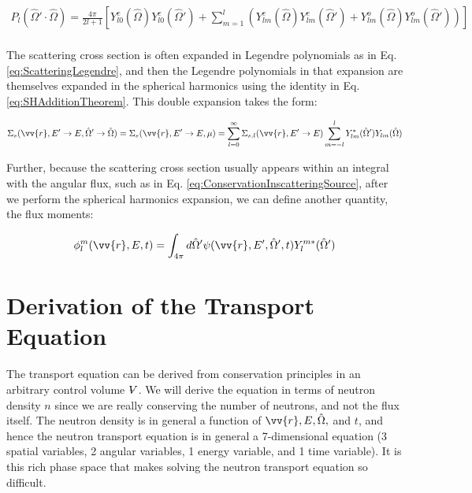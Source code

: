 \documentclass[10pt]{article}
\newcommand{\hO}{\hat{\Omega}}
\newcommand{\spas}{(\vv{r},E,t)}
\newcommand{\volume}{\mathop{\ooalign{\hfil$V$\hfil\cr\kern0.08em--\hfil\cr}}\nolimits}
\begin{document}
\begin{flushleft}
\begin{equation}
\begin{aligned}
\label{eq:FullExpansion5}
P_l(\hO  '\cdot\hO  )=\frac{4\pi}{2l+1}\left\lbrack Y_{l0}^e(\hO  )Y_{l0}^e(\hO  ')+\sum_{m=1}^{l}\left(Y_{lm}^e(\hO  )Y_{lm}^{e}(\hO  ')+Y_{lm}^o(\hO  )Y_{lm}^{o}(\hO  ')\right)\right\rbrack\\
\end{aligned}
\end{equation}





The scattering cross section is often expanded in Legendre polynomials as in Eq. \ref{eq:ScatteringLegendre}, and then the Legendre polynomials in that expansion are themselves expanded in the spherical harmonics using the identity in Eq. \ref{eq:SHAdditionTheorem}. This double expansion takes the form:

\begin{equation}
\label{eq:ScatteringLegendreandSH}
\Sigma_s(\vv{r}, E'\rightarrow E, \hO  '\rightarrow\hO  ) = \Sigma_s(\vv{r}, E'\rightarrow E, \mu) = \sum_{l=0}^{\infty} \Sigma_{s,l}(\vv{r}, E'\rightarrow E) \sum_{m=-l}^{l} Y_{lm}^{*} (\hO  ') Y_{lm}(\hO  )
\end{equation}

Further, because the scattering cross section usually appears within an integral with the angular flux, such as in Eq. \ref{eq:ConservationInscatteringSource}, after we perform the spherical harmonics expansion, we can define another quantity, the flux moments:

\begin{equation}
\label{eq:FluxMomentSH}
\phi_l^m\spas = \int_{4\pi}^{} d\hO  '\psi(\vv{r}, E', \hO  ', t)Y_l^{m*}(\hO  ')
\end{equation}

\clearpage
\section{Derivation of the Transport Equation}

The transport equation can be derived from conservation principles in an arbitrary control volume \(\volume\). We will derive the equation in terms of neutron density \(n\) since we are really conserving the number of neutrons, and not the flux itself. The neutron density is in general a function of \(\vv{r}, E, \hO,\) and \(t\), and hence the neutron transport equation is in general a 7-dimensional equation (3 spatial variables, 2 angular variables, 1 energy variable, and 1 time variable). It is this rich phase space that makes solving the neutron transport equation so difficult. 


\end{flushleft}
\end{document}
